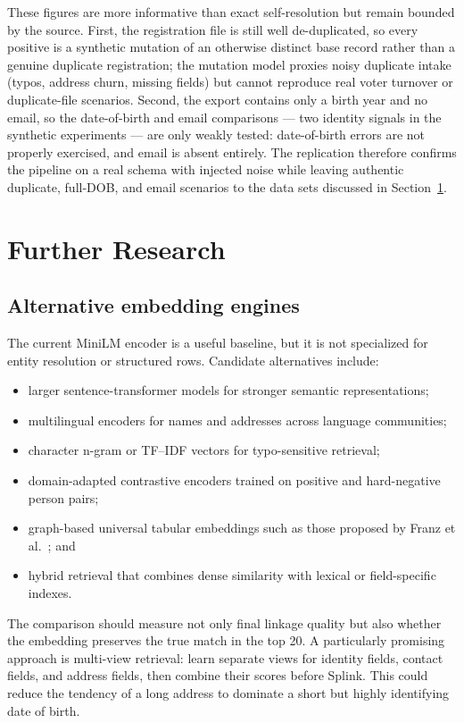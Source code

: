 \documentclass[conference]{IEEEtran}
\begin{document}
These figures are more informative than exact self-resolution but remain bounded by the source. First, the registration file is still well de-duplicated, so every positive is a synthetic mutation of an otherwise distinct base record rather than a genuine duplicate registration; the mutation model proxies noisy duplicate intake (typos, address churn, missing fields) but cannot reproduce real voter turnover or duplicate-file scenarios. Second, the export contains only a birth year and no email, so the date-of-birth and email comparisons --- two identity signals in the synthetic experiments --- are only weakly tested: date-of-birth errors are not properly exercised, and email is absent entirely. The replication therefore confirms the pipeline on a real schema with injected noise while leaving authentic duplicate, full-DOB, and email scenarios to the data sets discussed in Section~\ref{sec:further-research}.

\section{Further Research}
\label{sec:further-research}
\subsection{Alternative embedding engines}
The current MiniLM encoder is a useful baseline, but it is not specialized for entity resolution or structured rows. Candidate alternatives include:
\begin{itemize}[leftmargin=*]
  \item larger sentence-transformer models for stronger semantic representations;
  \item multilingual encoders for names and addresses across language communities;
  \item character n-gram or TF--IDF vectors for typo-sensitive retrieval;
  \item domain-adapted contrastive encoders trained on positive and hard-negative person pairs;
  \item graph-based universal tabular embeddings such as those proposed by Franz et al.~\cite{franz2025}; and
  \item hybrid retrieval that combines dense similarity with lexical or field-specific indexes.
\end{itemize}

The comparison should measure not only final linkage quality but also whether the embedding preserves the true match in the top 20. A particularly promising approach is multi-view retrieval: learn separate views for identity fields, contact fields, and address fields, then combine their scores before Splink. This could reduce the tendency of a long address to dominate a short but highly identifying date of birth.
\end{document}
